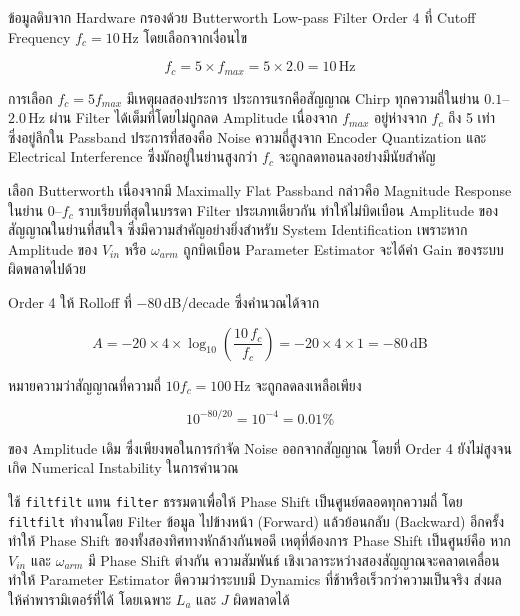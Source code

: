 ข้อมูลดิบจาก Hardware กรองด้วย Butterworth Low-pass Filter Order 4
ที่ Cutoff Frequency $f_c = 10$\,Hz โดยเลือกจากเงื่อนไข

\begin{equation}
  f_c = 5 \times f_{max} = 5 \times 2.0 = 10\,\text{Hz}
  \label{eq:fc}
\end{equation}

การเลือก $f_c = 5 f_{max}$ มีเหตุผลสองประการ ประการแรกคือสัญญาณ Chirp
ทุกความถี่ในย่าน $0.1$--$2.0$\,Hz ผ่าน Filter ได้เต็มที่โดยไม่ถูกลด Amplitude
เนื่องจาก $f_{max}$ อยู่ห่างจาก $f_c$ ถึง 5 เท่า ซึ่งอยู่ลึกใน Passband
ประการที่สองคือ Noise ความถี่สูงจาก Encoder Quantization และ Electrical
Interference ซึ่งมักอยู่ในย่านสูงกว่า $f_c$ จะถูกลดทอนลงอย่างมีนัยสำคัญ

เลือก Butterworth เนื่องจากมี Maximally Flat Passband กล่าวคือ
Magnitude Response ในย่าน $0$--$f_c$ ราบเรียบที่สุดในบรรดา Filter
ประเภทเดียวกัน ทำให้ไม่บิดเบือน Amplitude ของสัญญาณในย่านที่สนใจ
ซึ่งมีความสำคัญอย่างยิ่งสำหรับ System Identification เพราะหาก Amplitude
ของ $V_{in}$ หรือ $\omega_{arm}$ ถูกบิดเบือน Parameter Estimator
จะได้ค่า Gain ของระบบผิดพลาดไปด้วย

Order 4 ให้ Rolloff ที่ $-80$\,dB/decade ซึ่งคำนวณได้จาก

\begin{equation}
  A = -20 \times 4 \times \log_{10}\!\left(\frac{10\,f_c}{f_c}\right)
    = -20 \times 4 \times 1
    = -80\,\text{dB}
  \label{eq:attenuation}
\end{equation}

หมายความว่าสัญญาณที่ความถี่ $10 f_c = 100$\,Hz จะถูกลดลงเหลือเพียง

\begin{equation}
  10^{-80/20} = 10^{-4} = 0.01\%
\end{equation}

ของ Amplitude เดิม ซึ่งเพียงพอในการกำจัด Noise ออกจากสัญญาณ
โดยที่ Order 4 ยังไม่สูงจนเกิด Numerical Instability ในการคำนวณ

ใช้ \texttt{filtfilt} แทน \texttt{filter} ธรรมดาเพื่อให้ Phase Shift
เป็นศูนย์ตลอดทุกความถี่ โดย \texttt{filtfilt} ทำงานโดย Filter ข้อมูล
ไปข้างหน้า (Forward) แล้วย้อนกลับ (Backward) อีกครั้ง ทำให้ Phase Shift
ของทั้งสองทิศทางหักล้างกันพอดี เหตุที่ต้องการ Phase Shift เป็นศูนย์คือ
หาก $V_{in}$ และ $\omega_{arm}$ มี Phase Shift ต่างกัน ความสัมพันธ์
เชิงเวลาระหว่างสองสัญญาณจะคลาดเคลื่อน ทำให้ Parameter Estimator
ตีความว่าระบบมี Dynamics ที่ช้าหรือเร็วกว่าความเป็นจริง
ส่งผลให้ค่าพารามิเตอร์ที่ได้ โดยเฉพาะ $L_a$ และ $J$ ผิดพลาดได้

